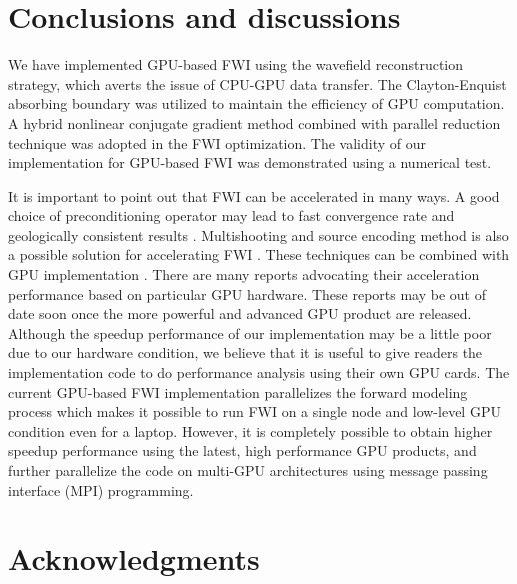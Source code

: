 


\section{Conclusions and discussions}

We have implemented GPU-based FWI using the wavefield reconstruction strategy, which averts the issue of CPU-GPU data transfer. The Clayton-Enquist absorbing boundary was utilized to maintain the efficiency of GPU computation. A hybrid nonlinear conjugate gradient method combined with parallel reduction technique was adopted in the FWI optimization. The validity of our  implementation for GPU-based FWI was demonstrated using a numerical test. 

It is important to point out that FWI can be accelerated in many ways. A good choice of preconditioning operator may lead to fast convergence rate and geologically consistent results \citep{virieux2009overview,ayeni2009joint,guitton2012constrained}. Multishooting and source encoding method is also a possible solution for accelerating FWI \citep{schiemenz2013accelerated,moghaddam2013new}. These techniques can be combined with GPU implementation \citep{wang2011cuda}. There are many reports advocating their acceleration performance based on particular GPU hardware. These reports may be out of date soon once the more powerful and advanced GPU product are released. Although the speedup performance of our implementation may be a little poor due to our hardware condition, we believe that it is useful to give readers the implementation code to do performance analysis using their own GPU cards. The current GPU-based FWI implementation parallelizes the forward modeling process which makes it possible to run FWI on a single node and low-level GPU condition even for a laptop. However, it  is completely possible to obtain higher speedup performance using the latest, high performance GPU products, and further parallelize the code on multi-GPU architectures using message passing interface (MPI) programming.

\section*{Acknowledgments}

